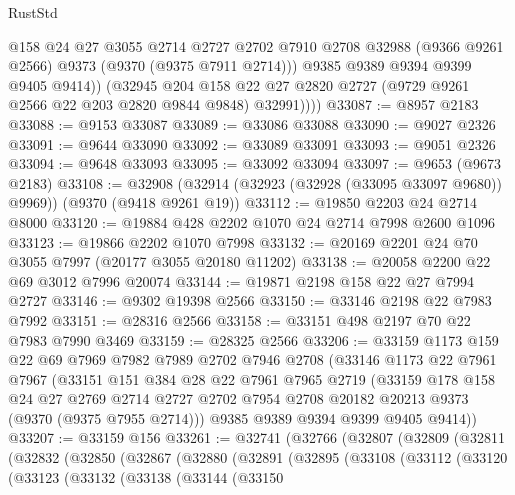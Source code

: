 \begin{lexlean}{RustStd}
\begin{coremodule}
                @158
                @24
                @27
                @3055
                @2714
                @2727
                @2702
                @7910
                @2708
                @32988
                (@9366 @9261 @2566)
                @9373
                (@9370 (@9375 @7911 @2714)))
              @9385
              @9389
              @9394
              @9399
              @9405
              @9414))
          (@32945
            @204
            @158
            @22
            @27
            @2820
            @2727
            (@9729 @9261 @2566 @22 @203 @2820 @9844 @9848)
            @32991))))
@33087 := @8957 @2183
@33088 := @9153 @33087
@33089 := @33086 @33088
@33090 := @9027 @2326
@33091 := @9644 @33090
@33092 := @33089 @33091
@33093 := @9051 @2326
@33094 := @9648 @33093
@33095 := @33092 @33094
@33097 := @9653 (@9673 @2183)
@33108 := @32908 (@32914 (@32923 (@32928 (@33095 @33097 @9680)) @9969)) (@9370 (@9418 @9261 @19))
@33112 := @19850 @2203 @24 @2714 @8000
@33120 := @19884 @428 @2202 @1070 @24 @2714 @7998 @2600 @1096
@33123 := @19866 @2202 @1070 @7998
@33132 := @20169 @2201 @24 @70 @3055 @7997 (@20177 @3055 @20180 @11202)
@33138 := @20058 @2200 @22 @69 @3012 @7996 @20074
@33144 := @19871 @2198 @158 @22 @27 @7994 @2727
@33146 := @9302 @19398 @2566
@33150 := @33146 @2198 @22 @7983 @7992
@33151 := @28316 @2566
@33158 := @33151 @498 @2197 @70 @22 @7983 @7990 @3469
@33159 := @28325 @2566
@33206 := @33159
    @1173
    @159
    @22
    @69
    @7969
    @7982
    @7989
    @2702
    @7946
    @2708
    (@33146
      @1173
      @22
      @7961
      @7967
      (@33151
        @151
        @384
        @28
        @22
        @7961
        @7965
        @2719
        (@33159
          @178
          @158
          @24
          @27
          @2769
          @2714
          @2727
          @2702
          @7954
          @2708
          @20182
          @20213
          @9373
          (@9370 (@9375 @7955 @2714)))
        @9385
        @9389
        @9394
        @9399
        @9405
        @9414))
@33207 := @33159 @156
@33261 := @32741
    (@32766
      (@32807
        (@32809
          (@32811
            (@32832
              (@32850
                (@32867
                  (@32880
                    (@32891
                      (@32895
                        (@33108
                          (@33112
                            (@33120
                              (@33123
                                (@33132
                                  (@33138
                                    (@33144
                                      (@33150

\end{coremodule}
\end{lexlean}

